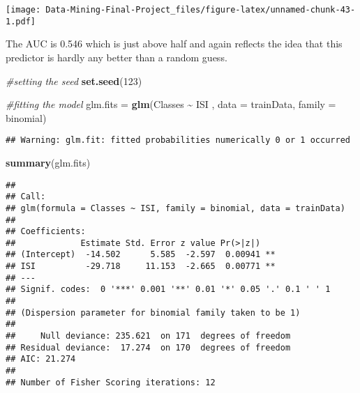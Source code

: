 \documentclass[
]{article}
\newenvironment{Shaded}{\begin{snugshade}}{\end{snugshade}}
\newcommand{\AttributeTok}[1]{\textcolor[rgb]{0.13,0.29,0.53}{#1}}
\newcommand{\CommentTok}[1]{\textcolor[rgb]{0.56,0.35,0.01}{\textit{#1}}}
\newcommand{\DecValTok}[1]{\textcolor[rgb]{0.00,0.00,0.81}{#1}}
\newcommand{\FloatTok}[1]{\textcolor[rgb]{0.00,0.00,0.81}{#1}}
\newcommand{\FunctionTok}[1]{\textcolor[rgb]{0.13,0.29,0.53}{\textbf{#1}}}
\newcommand{\NormalTok}[1]{#1}
\newcommand{\OtherTok}[1]{\textcolor[rgb]{0.56,0.35,0.01}{#1}}
\newcommand{\SpecialCharTok}[1]{\textcolor[rgb]{0.81,0.36,0.00}{\textbf{#1}}}
\newcommand{\StringTok}[1]{\textcolor[rgb]{0.31,0.60,0.02}{#1}}
\begin{document}
\texttt{[image: Data-Mining-Final-Project\_files/figure-latex/unnamed-chunk-43-1.pdf]}

The AUC is 0.546 which is just above half and again reflects the idea
that this predictor is hardly any better than a random guess.

\begin{Shaded}
\begin{Highlighting}[]
\CommentTok{\#setting the seed}
\FunctionTok{set.seed}\NormalTok{(}\DecValTok{123}\NormalTok{)}

\CommentTok{\#fitting the model}
\NormalTok{glm.fits }\OtherTok{=} \FunctionTok{glm}\NormalTok{(Classes }\SpecialCharTok{\textasciitilde{}}\NormalTok{ ISI , }\AttributeTok{data =}\NormalTok{ trainData, }\AttributeTok{family =}\NormalTok{ binomial)}
\end{Highlighting}
\end{Shaded}

\begin{verbatim}
## Warning: glm.fit: fitted probabilities numerically 0 or 1 occurred
\end{verbatim}

\begin{Shaded}
\begin{Highlighting}[]
\FunctionTok{summary}\NormalTok{(glm.fits)}
\end{Highlighting}
\end{Shaded}

\begin{verbatim}
## 
## Call:
## glm(formula = Classes ~ ISI, family = binomial, data = trainData)
## 
## Coefficients:
##             Estimate Std. Error z value Pr(>|z|)   
## (Intercept)  -14.502      5.585  -2.597  0.00941 **
## ISI          -29.718     11.153  -2.665  0.00771 **
## ---
## Signif. codes:  0 '***' 0.001 '**' 0.01 '*' 0.05 '.' 0.1 ' ' 1
## 
## (Dispersion parameter for binomial family taken to be 1)
## 
##     Null deviance: 235.621  on 171  degrees of freedom
## Residual deviance:  17.274  on 170  degrees of freedom
## AIC: 21.274
## 
## Number of Fisher Scoring iterations: 12
\end{verbatim}

\begin{Shaded}
\end{Shaded}
\end{document}
